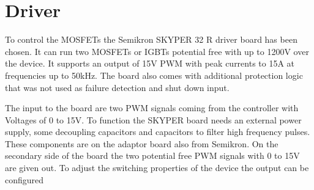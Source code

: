 \chapter{Driver}\label{ch:driver}

To control the MOSFETs the Semikron SKYPER 32 R driver board has been chosen. It can run two MOSFETs or IGBTs potential free with up to 1200V over the device. It supports an output of 15V PWM with peak currents to 15A at frequencies up to 50kHz.
The board also comes with additional protection logic that was not used as failure detection and shut down input.

The input to the board are two PWM signals coming from the controller with Voltages of 0 to 15V. To function the SKYPER board needs an external power supply, some decoupling capacitors and capacitors to filter high frequency pulses. These components are on the adaptor board also from Semikron. 
On the secondary side of the board the two potential free PWM signals with 0 to 15V are given out. To adjust the switching properties of the device the output can be configured 
